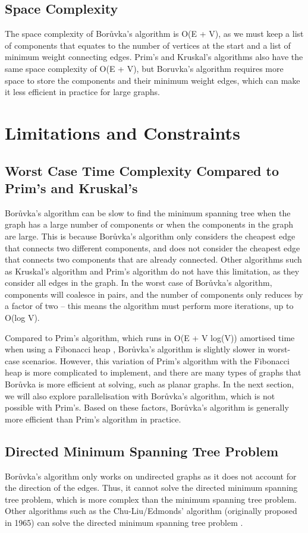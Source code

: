 \documentclass[a4paper, 11pt]{article}
\begin{document}
\subsection{Space Complexity}
The space complexity of Borůvka's algorithm is O(E + V), as we must keep a list of components that equates to the number of vertices at the start and a list of minimum weight connecting edges. Prim's and Kruskal's algorithms also have the same space complexity of O(E + V), but Boruvka's algorithm requires more space to store the components and their minimum weight edges, which can make it less efficient in practice for large graphs.

\section{Limitations and Constraints}

\subsection{Worst Case Time Complexity Compared to Prim's and Kruskal's}
Borůvka's algorithm can be slow to find the minimum spanning tree when the graph has a large number of components or when the components in the graph are large. This is because Borůvka's algorithm only considers the cheapest edge that connects two different components, and does not consider the cheapest edge that connects two components that are already connected. Other algorithms such as Kruskal's algorithm and Prim's algorithm do not have this limitation, as they consider all edges in the graph. In the worst case of Borůvka's algorithm, components will coalesce in pairs, and the number of components only reduces by a factor of two -- this means the algorithm must perform more iterations, up to O(log V). 

Compared to Prim's algorithm, which runs in O(E + V log(V)) amortised time when using a Fibonacci heap \cite{fredman1987fibonacci}, Borůvka's algorithm is slightly slower in worst-case scenarios. However, this variation of Prim's algorithm with the Fibonacci heap is more complicated to implement, and there are many types of graphs that Borůvka is more efficient at solving, such as planar graphs. In the next section, we will also explore parallelisation with Borůvka's algorithm, which is not possible with Prim's. Based on these factors, Borůvka's algorithm is generally more efficient than Prim's algorithm in practice.

\subsection{Directed Minimum Spanning Tree Problem}
Borůvka's algorithm only works on undirected graphs as it does not account for the direction of the edges. Thus, it cannot solve the directed minimum spanning tree problem, which is more complex than the minimum spanning tree problem. Other algorithms such as the Chu-Liu/Edmonds' algorithm (originally proposed in 1965) can solve the directed minimum spanning tree problem \cite{gabow1986efficient}.
\end{document}
